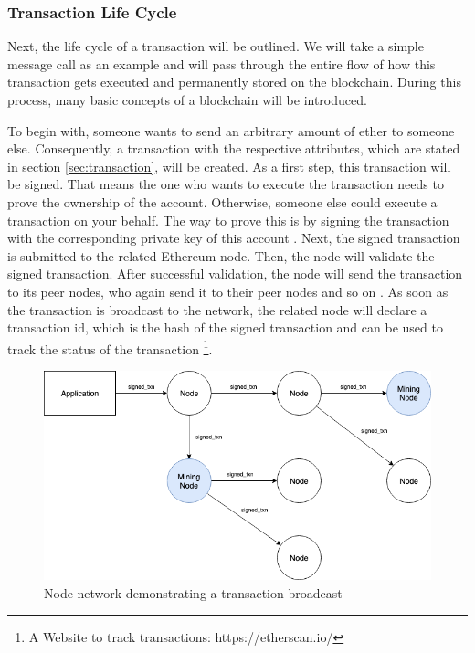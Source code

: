 \subsubsection{Transaction Life Cycle}
\label{sec:transaction_lifecycle}
Next, the life cycle of a transaction will be outlined. 
We will take a simple message call as an example 
and will pass through the entire flow of how this transaction 
gets executed and permanently stored on the blockchain. 
During this process, many basic concepts of a blockchain will be introduced. 

To begin with, someone wants to send an arbitrary amount of ether to someone else. 
Consequently, a transaction with the respective attributes, which are stated 
in section \ref{sec:transaction}, will be created. As a first step, this transaction 
will be signed. That means the one who wants to execute the transaction needs to prove the 
ownership of the account. Otherwise, someone else could execute a transaction on your behalf. 
The way to prove this is by signing the transaction with the corresponding private
key of this account . 
Next, the signed transaction is submitted to the related Ethereum node. 
Then, the node will validate the signed transaction. 
After successful validation, the node will send the transaction to 
its peer nodes, who again send it to their 
peer nodes and so on . 
As soon as the transaction is broadcast to the network, 
the related node will declare a transaction id, which is the hash 
of the signed transaction and can be used to track the 
status of the transaction \footnote{A Website to track transactions: https://etherscan.io/}. 

\begin{figure}[htbp]
	\centering
	\includegraphics[width=.7\linewidth]{./figures/node_network.png}
	\caption{Node network demonstrating a transaction broadcast}
	\label{figure:node_network}
\end{figure}

\clearpage

